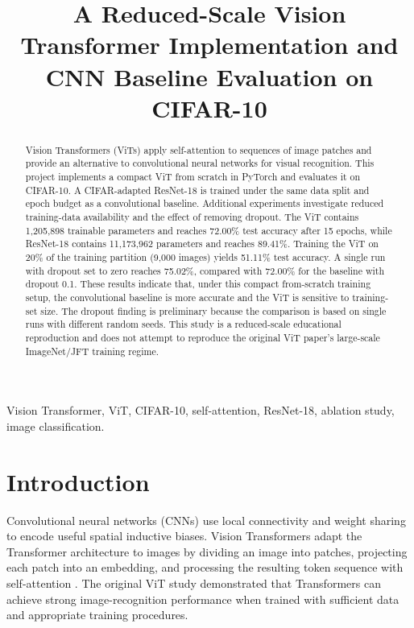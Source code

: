 \documentclass[conference]{IEEEtran}
\title{A Reduced-Scale Vision Transformer Implementation and CNN Baseline Evaluation on CIFAR-10}
\author{
\IEEEauthorblockN{Aditya Kumar Jha}
\IEEEauthorblockA{Independent Course Project\\
Email: [add institutional email if required]}
}
\begin{document}
\maketitle

\begin{abstract}
Vision Transformers (ViTs) apply self-attention to sequences of image patches and provide an alternative to convolutional neural networks for visual recognition. This project implements a compact ViT from scratch in PyTorch and evaluates it on CIFAR-10. A CIFAR-adapted ResNet-18 is trained under the same data split and epoch budget as a convolutional baseline. Additional experiments investigate reduced training-data availability and the effect of removing dropout. The ViT contains 1,205,898 trainable parameters and reaches 72.00\% test accuracy after 15 epochs, while ResNet-18 contains 11,173,962 parameters and reaches 89.41\%. Training the ViT on 20\% of the training partition (9,000 images) yields 51.11\% test accuracy. A single run with dropout set to zero reaches 75.02\%, compared with 72.00\% for the baseline with dropout 0.1. These results indicate that, under this compact from-scratch training setup, the convolutional baseline is more accurate and the ViT is sensitive to training-set size. The dropout finding is preliminary because the comparison is based on single runs with different random seeds. This study is a reduced-scale educational reproduction and does not attempt to reproduce the original ViT paper's large-scale ImageNet/JFT training regime.
\end{abstract}

\begin{IEEEkeywords}
Vision Transformer, ViT, CIFAR-10, self-attention, ResNet-18, ablation study, image classification.
\end{IEEEkeywords}

\section{Introduction}
Convolutional neural networks (CNNs) use local connectivity and weight sharing to encode useful spatial inductive biases. Vision Transformers adapt the Transformer architecture to images by dividing an image into patches, projecting each patch into an embedding, and processing the resulting token sequence with self-attention \cite{dosovitskiy2021}. The original ViT study demonstrated that Transformers can achieve strong image-recognition performance when trained with sufficient data and appropriate training procedures.
\end{document}
